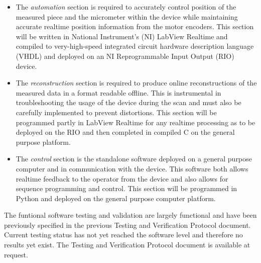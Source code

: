 \documentclass{article}
\begin{document}
\begin{itemize}
\item The \textit{automation} section is required to accurately
  control position of the measured piece and the micrometer within the
  device while maintaining accurate realtime position information from
  the motor encoders. This section will be written in National
  Instrument's (NI) LabView Realtime and compiled to very-high-speed
  integrated circuit hardware description language (VHDL) and deployed
  on an NI Reprogrammable Input Output (RIO) device.
\item The \textit{reconstruction} section is required to produce
  online reconstructions of the measured data in a format readable
  offline. This is instrumental in troubleshooting the usage of the
  device during the scan and must also be carefully implemented to
  prevent distortions. This section will be programmed partly in
  LabView Realtime for any realtime processing as to be deployed on
  the RIO and then completed in compiled C on the general purpose
  platform.
\item The \textit{control} section is the standalone software deployed
  on a general purpose computer and in communication with the
  device. This software both allows realtime feedback to the operator
  from the device and also allows for sequence programming and
  control. This section will be programmed in Python and deployed on
  the general purpose computer platform.
\end{itemize}

The funtional software testing and validation are largely functional
and have been previously specified in the previous Testing and
Verification Protocol document. Current testing status has not yet
reached the software level and therefore no results yet exist. The
Testing and Verification Protocol document is available at request.





\newpage
{}


\end{document}
